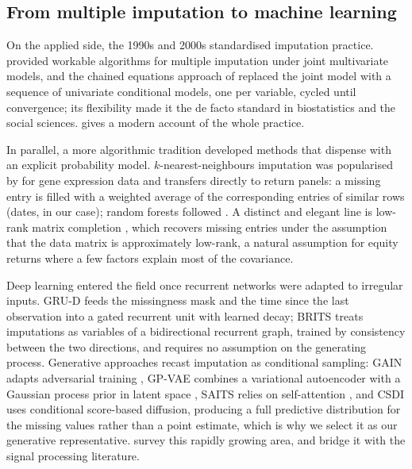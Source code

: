 \subsection{From multiple imputation to machine learning}
\label{sec:lit_ml}

On the applied side, the 1990s and 2000s standardised imputation
practice. \citet{schafer1997} provided workable algorithms for
multiple imputation under joint multivariate models, and the chained
equations approach of \citet{vanbuuren2011} replaced the joint model
with a sequence of univariate conditional models, one per variable,
cycled until convergence; its flexibility made it the de facto
standard in biostatistics and the social sciences.
\citet{vanbuuren2018} gives a modern account of the whole practice.

In parallel, a more algorithmic tradition developed methods that
dispense with an explicit probability model. $k$-nearest-neighbours
imputation was popularised by \citet{troyanskaya2001} for gene
expression data and transfers directly to return panels: a missing
entry is filled with a weighted average of the corresponding entries
of similar rows (dates, in our case); random forests followed
\citep{stekhoven2012}. A distinct and elegant line is low-rank matrix
completion \citep{candes2009, mazumder2010}, which recovers missing
entries under the assumption that the data matrix is approximately
low-rank, a natural assumption for equity returns where a few factors
explain most of the covariance.

Deep learning entered the field once recurrent networks were adapted
to irregular inputs. GRU-D \citep{grud} feeds the missingness mask
and the time since the last observation into a gated recurrent unit
with learned decay; BRITS \citep{cao2018} treats imputations as
variables of a bidirectional recurrent graph, trained by consistency
between the two directions, and requires no assumption on the
generating process. Generative approaches recast imputation as
conditional sampling: GAIN adapts adversarial training
\citep{yoon2018}, GP-VAE combines a variational autoencoder with a
Gaussian process prior in latent space \citep{fortuin2020}, SAITS
relies on self-attention \citep{du2023}, and CSDI \citep{tashiro2021}
uses conditional score-based diffusion, producing a full predictive
distribution for the missing values rather than a point estimate,
which is why we select it as our generative representative.
\citet{deeplearning_survey2024} survey this rapidly growing area, and
\citet{missingsignals2025} bridge it with the signal processing
literature.

